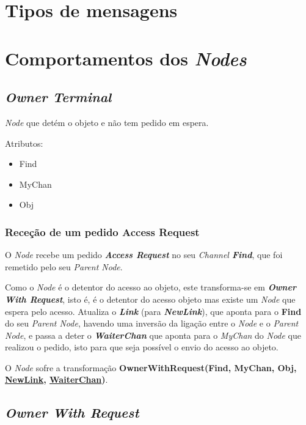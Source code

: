 \section{Tipos de mensagens}


\section{Comportamentos dos \emph{Nodes}}
\subsection*{\emph{Owner Terminal}}
\label{especificacao:nodes:owner_terminal}


\emph{Node} que detém o objeto e não tem pedido em espera.

Atributos:
\begin{itemize}
    \item Find
    \item MyChan
    \item Obj
\end{itemize}


\subsubsection*{Receção de um pedido Access Request}
O \emph{Node} recebe um pedido \emph{\textbf{Access Request}} no seu \emph{Channel \textbf{Find}},
que foi remetido pelo seu \emph{Parent Node}. 


Como o \emph{Node} é o detentor do acesso ao objeto, este transforma-se em \emph{\textbf{Owner With Request}},
isto é, é o detentor do acesso objeto mas existe um \emph{Node} que espera pelo acesso.
Atualiza o \textbf{\emph{Link}} (para \textbf{\emph{NewLink}}),
que aponta para o \textbf{Find} do seu \emph{Parent Node}, havendo uma inversão da ligação entre o \emph{Node} e o \emph{Parent Node},
e passa a deter o \textbf{\emph{WaiterChan}} que aponta para o \emph{MyChan} do \emph{Node} que realizou o pedido, isto para
que seja possível o envio do acesso ao objeto.


O \emph{Node} sofre a transformação \textbf{OwnerWithRequest(Find, MyChan, Obj, \underline{NewLink}, \underline{WaiterChan})}.



\subsection*{\emph{Owner With Request}}
\label{especificacao:nodes:owner_with_request}

